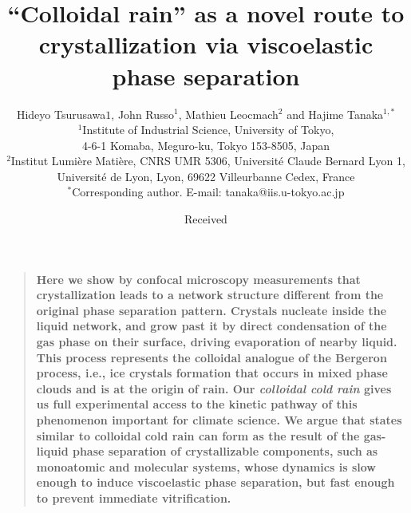 \documentclass[12pt]{article}
\title{``Colloidal rain'' as a novel route to crystallization via viscoelastic phase separation}
\author{Hideyo Tsurusawa$1$, John Russo$^1$, Mathieu Leocmach$^{2}$ and Hajime Tanaka$^{1,\ast}$ 
\\
\normalsize{$^1$Institute of Industrial Science, University of Tokyo,}\\
\normalsize{4-6-1 Komaba, Meguro-ku, Tokyo 153-8505, Japan}\\
\normalsize{$^2$Institut Lumière Matière, CNRS UMR 5306, Université Claude Bernard Lyon 1, }\\
\normalsize{Université de Lyon, Lyon, 69622 Villeurbanne Cedex, France}\\
\normalsize{$^\ast$Corresponding author. E-mail: tanaka@iis.u-tokyo.ac.jp}}
\date{Received}
\newenvironment{sciabstract}{%
\begin{quote} \bf}
{\end{quote}}
\begin{document}
\baselineskip24pt


\maketitle
\vspace{-1cm}
\begin{sciabstract}
Here we show by confocal microscopy measurements that crystallization leads to a network structure different from the original phase separation pattern. Crystals nucleate inside the liquid network, and grow past it by direct condensation of the gas phase on their surface, driving evaporation of nearby liquid. This process represents the colloidal analogue of the Bergeron process, i.e., ice crystals formation that occurs in mixed phase clouds and is at the origin of rain. Our \emph{colloidal cold rain} gives us full experimental access to the kinetic pathway of this phenomenon important for climate science. We argue that states similar to colloidal cold rain can form as the result of the gas-liquid phase separation of crystallizable components, such as monoatomic and molecular systems, whose dynamics is slow enough to induce viscoelastic phase separation, but fast enough to prevent immediate vitrification.
\end{sciabstract}


\maketitle

\clearpage
\end{document}
